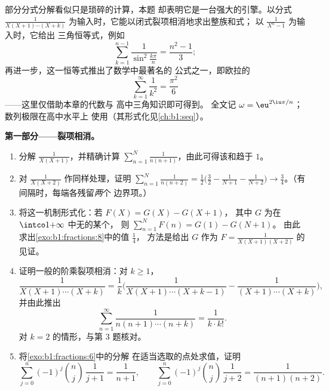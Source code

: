 \begin{problem}\label{pb:b1:fractions:1}
部分分式分解看似只是琐碎的计算，本题
却表明它是一台强大的引擎。以分式
$\frac1{X(X+1)\cdots(X+k)}$ 为输入时，它能以闭式裂项相消地求出整族和式；
以 $\frac1{X^n - 1}$ 为输入时，它给出
三角恒等式，例如
\[
\sum_{k=1}^{n-1}\frac{1}{\sin^2\frac{k\pi}{n}} = \frac{n^2-1}{3} ;
\]
再进一步，这一恒等式推出了数学中最著名的
公式之一，即欧拉的
\[
\sum_{k=1}^{\infty}\frac1{k^2} = \frac{\pi^2}{6}
\]
——这里仅借助本章的代数与
高中三角知识即可得到。
全文记 $\omega = \eu^{2\iu\pi/n}$；数列极限在高中水平上
使用（其形式化见\cref{ch:b1:seq}）。

\medskip
\noindent\textbf{第一部分——裂项相消。}
\begin{enumerate}
  \item 分解 $\frac1{X(X+1)}$，并精确计算 $\sum_{n=1}^{N}
        \frac1{n(n+1)}$，由此可得该和趋于
        $1$。
  \item 对 $\frac1{X(X+2)}$ 作同样处理，证明 $\sum_{n=1}^{N}
        \frac1{n(n+2)} = \frac12\bigl(\frac32 - \frac1{N+1} -
        \frac1{N+2}\bigr) \to \frac34$。（有间隔时，每端各残留\emph{两}个
        边界项。）
  \item 将这一机制形式化：若 $F(X) = G(X) - G(X+1)$，
        其中 $G$ 为在 $\intco1{+\infty}$ 中无的某个，
        则 $\sum_{n=1}^N F(n) = G(1) - G(N+1)$。
        由此求出\cref{exo:b1:fractions:8}中的值 $\frac14$，
        方法是给出 $G$ 作为 $F = \frac1{X(X+1)(X+2)}$ 的见证。
  \item 证明一般的阶乘裂项相消：对 $k \geq 1$，
        \[
        \frac{1}{X(X+1)\cdots(X+k)}
        = \frac1k\biggl(\frac{1}{X(X+1)\cdots(X+k-1)}
        - \frac{1}{(X+1)\cdots(X+k)}\biggr),
        \]
        并由此推出
        \[
        \sum_{n=1}^{\infty}\frac{1}{n(n+1)\cdots(n+k)}
        = \frac{1}{k \cdot k!} .
        \]
        对 $k = 2$ 的情形，与第 3 题核对。
  \item 将\cref{exo:b1:fractions:6}中的分解
        在适当选取的点处求值，证明
        \[
        \sum_{j=0}^{n}(-1)^j\binom nj\,\frac1{j+1}
        = \frac1{n+1},
        \qquad
        \sum_{j=0}^{n}(-1)^j\binom nj\,\frac1{j+2}
        = \frac1{(n+1)(n+2)} .
        \]
\end{enumerate}


\end{problem}

